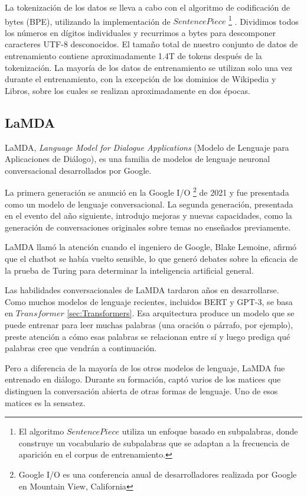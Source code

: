 La tokenización de los datos se lleva a cabo con el algoritmo de codificación de bytes (BPE), utilizando la implementación de  $SentencePiece$ \footnote{El algoritmo $SentencePiece$ \cite{kudo2018sentencepiece} utiliza un enfoque basado en subpalabras, donde construye un vocabulario de subpalabras que se adaptan a la frecuencia de aparición en el corpus de entrenamiento. } . Dividimos todos los números en dígitos individuales y recurrimos a bytes para descomponer caracteres UTF-8 desconocidos. El tamaño total de nuestro conjunto de datos de entrenamiento contiene aproximadamente 1.4T de tokens después de la tokenización. La mayoría de los datos de entrenamiento se utilizan solo una vez durante el entrenamiento, con la excepción de los dominios de Wikipedia y Libros, sobre los cuales se realizan aproximadamente en dos épocas.
\subsection{LaMDA}
\label{sec:LaMDA}
LaMDA, \textit{Language Model for Dialogue Applications} (Modelo de Lenguaje para Aplicaciones de Diálogo), es una familia de modelos de lenguaje neuronal conversacional desarrollados por Google.

La primera generación se anunció en la Google I/O \footnote{Google I/O es una conferencia anual de desarrolladores realizada por Google en Mountain View, California} de 2021 y fue presentada como un modelo de lenguaje conversacional. La segunda generación, presentada en el evento del año siguiente, introdujo mejoras y nuevas capacidades, como la generación de conversaciones originales sobre temas no enseñados previamente. 

LaMDA llamó la atención cuando el ingeniero de Google, Blake Lemoine, afirmó que el chatbot se había vuelto sensible, lo que generó debates sobre la eficacia de la prueba de Turing para determinar la inteligencia artificial general.

Las habilidades conversacionales de LaMDA tardaron años en desarrollarse. Como muchos modelos de lenguaje recientes, incluidos BERT y GPT-3, se basa en $Transformer$ \ref{sec:Transformers}. Esa arquitectura produce un modelo que se puede entrenar para leer muchas palabras (una oración o párrafo, por ejemplo), preste atención a cómo esas palabras se relacionan entre sí y luego prediga qué palabras cree que vendrán a continuación. 

Pero a diferencia de la mayoría de los otros modelos de lenguaje, LaMDA fue entrenado en diálogo. Durante su formación, captó varios de los matices que distinguen la conversación abierta de otras formas de lenguaje. Uno de esos matices es la sensatez. 

